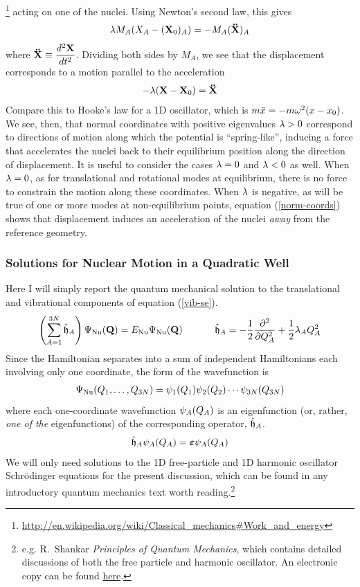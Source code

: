 \documentclass[11pt]{article}
\begin{document}
\footnote{\url{http://en.wikipedia.org/wiki/Classical_mechanics\#Work_and_energy}}
acting on one of the nuclei. Using Newton's second law, this gives
\begin{align*}
    \lambda M_A (X_A-(\mathbf{X}_0)_A)
    = -M_A (\mathbf{\ddot{X}})_A
\end{align*}
where $\mathbf{\ddot{X}}\equiv \dfrac{d^2\mathbf{X}}{dt^2}$.
Dividing both sides by $M_A$, we see that the displacement corresponds to a
motion parallel to the acceleration
\begin{align}
\label{norm-coords}
    -\lambda
    (\mathbf{X}-\mathbf{X}_0)
=   \mathbf{\ddot{X}}
\end{align}
Compare this to Hooke's law for a 1D oscillator, which is
$m\ddot{x}=-m\omega^2(x-x_0)$. We see, then, that normal coordinates with positive
eigenvalues $\lambda>0$ correspond to directions of motion along which the
potential is ``spring-like'', inducing a force that accelerates the nuclei back
to their equilibrium position along the direction of displacement. It is useful
to consider the cases $\lambda=0$ and $\lambda<0$ as well. When $\lambda=0$, as for
translational and rotational modes at equilibrium, there is no force to
constrain the motion along these coordinates. When $\lambda$ is negative, as will
be true of one or more modes at non-equilibrium points, equation
(\ref{norm-coords}) shows that displacement induces an acceleration of the
nuclei {\it away} from the reference geometry.

\subsubsection{Solutions for Nuclear Motion in a Quadratic Well}
Here I will simply report the quantum mechanical solution to the translational
and vibrational components of equation (\ref{vib-se}).
\begin{align*}
\left(\sum_{A=1}^{3N}
    \hat{\mathfrak{h}}_A \right)
    \Psi_{\mathrm{Nu}}(\mathbf{Q})
=
    E_{\mathrm{Nu}}
    \Psi_{\mathrm{Nu}}(\mathbf{Q})
\ \ \ \ \ \ \ \ \ \ 
    \hat{\mathfrak{h}}_A
=
-\dfrac{1}{2}
     \dfrac{ \partial^{2}  }{\partial Q_A ^{2}}
+\dfrac{1}{2}
    \lambda_A Q_A^2
\end{align*}
Since the Hamiltonian separates into a sum of independent Hamiltonians each
involving only one coordinate, the form of the wavefunction is
\begin{align}
    \Psi_{\mathrm{Nu}}(Q_1,\ldots,Q_{3N})
=
    \psi_1(Q_1)
    \psi_2(Q_2)
    \cdots
    \psi_{3N}(Q_{3N})
\end{align}
where each one-coordinate wavefunction $\psi_A(Q_A)$ is an eigenfunction (or,
rather, {\it one of the} eigenfunctions) of the corresponding operator,
$\hat{\mathfrak{h}}_A$.
\begin{align}
    \hat{\mathfrak{h}}_A
    \psi_A(Q_A)
=
    \bm\varepsilon
    \psi_A(Q_A)
\end{align}
We will only need solutions to the 1D free-particle and 1D harmonic oscillator
Schr\"odinger equations for the present discussion, which can be found in any
introductory quantum mechanics text worth reading.\footnote{e.g. R.\ Shankar
{\it Principles of Quantum Mechanics}, which contains detailed discussions of
both the free particle and harmonic oscillator. An electronic copy can be found
\href{http://home.basu.ac.ir/\~psu/Books/\%5BRamamurti_Shankar\%5D_Principles_of_Quantum_Mechanic\%28BookFi.org\%29.pdf}{here}.}
\end{document}
